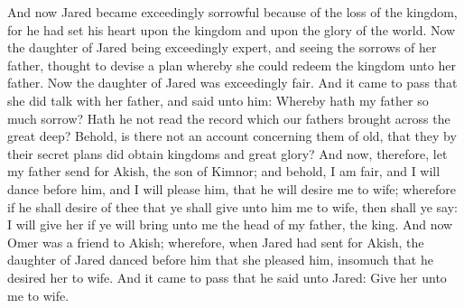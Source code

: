 And now Jared became exceedingly sorrowful because of the loss of the kingdom, for he had set his heart upon the kingdom and upon the glory of the world.
\bverse \iffalse Now the daughter of Jared being exceedingly expert, and seeing the sorrows of her father, thought to devise a plan whereby she could redeem the kingdom unto her father. \fi
Now the daughter of Jared being exceedingly expert, and seeing the sorrows of her father, thought to devise a plan whereby she could redeem the kingdom unto her father.
\bverse \iffalse Now the daughter of Jared was exceedingly fair. And it came to pass that she did talk with her father, and said unto him: Whereby hath my father so much sorrow? Hath he not read the record which our fathers brought across the great deep? Behold, is there not an account concerning them of old, that they by their secret plans did obtain kingdoms and great glory? \fi
Now the daughter of Jared was exceedingly fair. And it came to pass that she did talk with her father, and said unto him: Whereby hath my father so much sorrow? Hath he not read the record which our fathers brought across the great deep? Behold, is there not an account concerning them of old, that they by their secret plans did obtain kingdoms and great glory?
\bverse \iffalse And now, therefore, let my father send for Akish, the son of Kimnor; and behold, I am fair, and I will dance before him, and I will please him, that he will desire me to wife; wherefore if he shall desire of thee that ye shall give unto him me to wife, then shall ye say: I will give her if ye will bring unto me the head of my father, the king. \fi
And now, therefore, let my father send for Akish, the son of Kimnor; and behold, I am fair, and I will dance before him, and I will please him, that he will desire me to wife; wherefore if he shall desire of thee that ye shall give unto him me to wife, then shall ye say: I will give her if ye will bring unto me the head of my father, the king.
\bverse \iffalse And now Omer was a friend to Akish; wherefore, when Jared had sent for Akish, the daughter of Jared danced before him that she pleased him, insomuch that he desired her to wife. And it came to pass that he said unto Jared: Give her unto me to wife. \fi
And now Omer was a friend to Akish; wherefore, when Jared had sent for Akish, the daughter of Jared danced before him that she pleased him, insomuch that he desired her to wife. And it came to pass that he said unto Jared: Give her unto me to wife.
\bverse \iffalse And Jared said unto him: I will give her unto you, if ye will bring unto me the head of my father, the king. \fi
